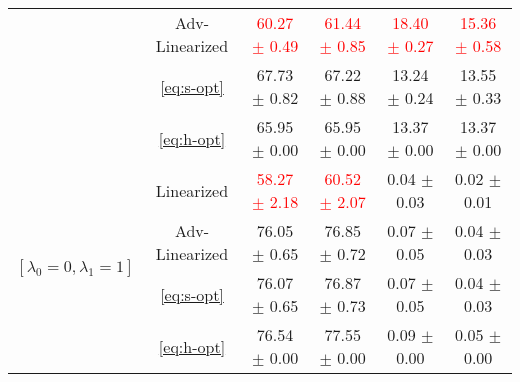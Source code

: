 \begin{table*}[ht!]
\begin{adjustbox}{max width=1\textwidth,center}
\begin{tabular}{cccccc}
& Adv-Linearized  & \textcolor{red}{60.27 $\pm$ 0.49} & \textcolor{red}{61.44 $\pm$ 0.85 }  & \textcolor{red}{18.40 $\pm$ 0.27 }& \textcolor{red}{15.36 $\pm$ 0.58 }  \\
& \ref{eq:s-opt} & 67.73 $\pm$ 0.82 & 67.22 $\pm$ 0.88   & 13.24 $\pm$ 0.24 & 13.55 $\pm$ 0.33  \\
& \ref{eq:h-opt} & 65.95 $\pm$ 0.00 & 65.95 $\pm$ 0.00   & 13.37 $\pm$ 0.00 & 13.37 $\pm$ 0.00  \\
\midrule %
\multirow{4}{*}{$[\lambda_0=0, \lambda_1 = 1]$}
& Linearized & \textcolor{red}{58.27 $\pm$ 2.18} & \textcolor{red}{60.52 $\pm$ 2.07 }  & 0.04 $\pm$ 0.03 & 0.02 $\pm$ 0.01  \\ 
& Adv-Linearized  & 76.05 $\pm$ 0.65 & 76.85 $\pm$ 0.72   & 0.07 $\pm$ 0.05 & 0.04 $\pm$ 0.03  \\
& \ref{eq:s-opt}  & 76.07 $\pm$ 0.65 & 76.87 $\pm$ 0.73   & 0.07 $\pm$ 0.05 & 0.04 $\pm$ 0.03  \\
& \ref{eq:h-opt} & 76.54 $\pm$ 0.00 & 77.55 $\pm$ 0.00   & 0.09 $\pm$ 0.00 & 0.05 $\pm$ 0.00  \\
\bottomrule 
\end{tabular}
\end{adjustbox}
\vskip -0.1in
\end{table*}


